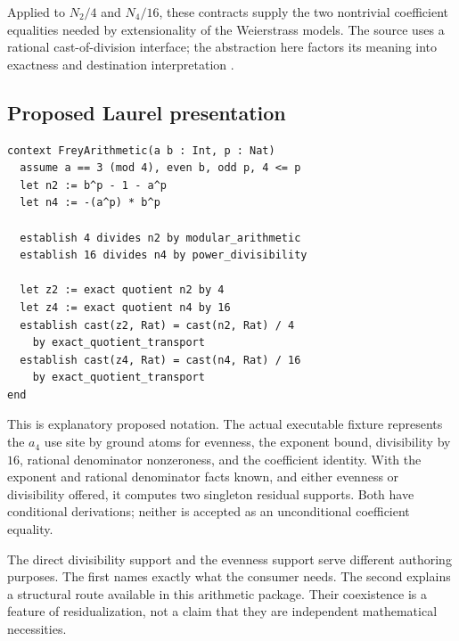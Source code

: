 \documentclass[11pt,a4paper]{article}
\theoremstyle{definition}
\theoremstyle{remark}
\begin{document}
Applied to $N_2/4$ and $N_4/16$, these contracts supply the two nontrivial coefficient equalities needed by extensionality of the Weierstrass models. The source uses a rational cast-of-division interface; the abstraction here factors its meaning into exactness and destination interpretation \cite{freymap}.

\subsection{Proposed Laurel presentation}
\begin{lstlisting}
context FreyArithmetic(a b : Int, p : Nat)
  assume a == 3 (mod 4), even b, odd p, 4 <= p
  let n2 := b^p - 1 - a^p
  let n4 := -(a^p) * b^p

  establish 4 divides n2 by modular_arithmetic
  establish 16 divides n4 by power_divisibility

  let z2 := exact quotient n2 by 4
  let z4 := exact quotient n4 by 16
  establish cast(z2, Rat) = cast(n2, Rat) / 4
    by exact_quotient_transport
  establish cast(z4, Rat) = cast(n4, Rat) / 16
    by exact_quotient_transport
end
\end{lstlisting}
This is explanatory proposed notation. The actual executable fixture represents the $a_4$ use site by ground atoms for evenness, the exponent bound, divisibility by $16$, rational denominator nonzeroness, and the coefficient identity. With the exponent and rational denominator facts known, and either evenness or divisibility offered, it computes two singleton residual supports. Both have conditional derivations; neither is accepted as an unconditional coefficient equality.

The direct divisibility support and the evenness support serve different authoring purposes. The first names exactly what the consumer needs. The second explains a structural route available in this arithmetic package. Their coexistence is a feature of residualization, not a claim that they are independent mathematical necessities.
\end{document}
